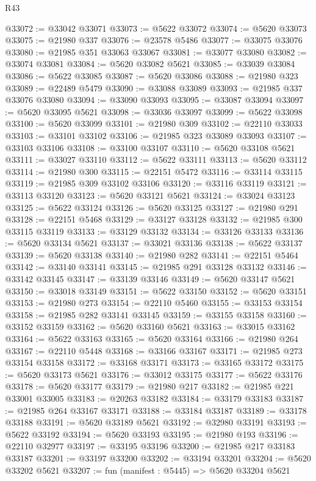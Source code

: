 \begin{lexlean}{R43}
\begin{coremodule}
@33072 := @33042 @33071
@33073 := @5622 @33072
@33074 := @5620 @33073
@33075 := @21980 @337
@33076 := @23578 @5486
@33077 := @33075 @33076
@33080 := @21985 @351 @33063 @33067
@33081 := @33077 @33080
@33082 := @33074 @33081
@33084 := @5620 @33082 @5621
@33085 := @33039 @33084
@33086 := @5622 @33085
@33087 := @5620 @33086
@33088 := @21980 @323
@33089 := @22489 @5479
@33090 := @33088 @33089
@33093 := @21985 @337 @33076 @33080
@33094 := @33090 @33093
@33095 := @33087 @33094
@33097 := @5620 @33095 @5621
@33098 := @33036 @33097
@33099 := @5622 @33098
@33100 := @5620 @33099
@33101 := @21980 @309
@33102 := @22110 @33033
@33103 := @33101 @33102
@33106 := @21985 @323 @33089 @33093
@33107 := @33103 @33106
@33108 := @33100 @33107
@33110 := @5620 @33108 @5621
@33111 := @33027 @33110
@33112 := @5622 @33111
@33113 := @5620 @33112
@33114 := @21980 @300
@33115 := @22151 @5472
@33116 := @33114 @33115
@33119 := @21985 @309 @33102 @33106
@33120 := @33116 @33119
@33121 := @33113 @33120
@33123 := @5620 @33121 @5621
@33124 := @33024 @33123
@33125 := @5622 @33124
@33126 := @5620 @33125
@33127 := @21980 @291
@33128 := @22151 @5468
@33129 := @33127 @33128
@33132 := @21985 @300 @33115 @33119
@33133 := @33129 @33132
@33134 := @33126 @33133
@33136 := @5620 @33134 @5621
@33137 := @33021 @33136
@33138 := @5622 @33137
@33139 := @5620 @33138
@33140 := @21980 @282
@33141 := @22151 @5464
@33142 := @33140 @33141
@33145 := @21985 @291 @33128 @33132
@33146 := @33142 @33145
@33147 := @33139 @33146
@33149 := @5620 @33147 @5621
@33150 := @33018 @33149
@33151 := @5622 @33150
@33152 := @5620 @33151
@33153 := @21980 @273
@33154 := @22110 @5460
@33155 := @33153 @33154
@33158 := @21985 @282 @33141 @33145
@33159 := @33155 @33158
@33160 := @33152 @33159
@33162 := @5620 @33160 @5621
@33163 := @33015 @33162
@33164 := @5622 @33163
@33165 := @5620 @33164
@33166 := @21980 @264
@33167 := @22110 @5448
@33168 := @33166 @33167
@33171 := @21985 @273 @33154 @33158
@33172 := @33168 @33171
@33173 := @33165 @33172
@33175 := @5620 @33173 @5621
@33176 := @33012 @33175
@33177 := @5622 @33176
@33178 := @5620 @33177
@33179 := @21980 @217
@33182 := @21985 @221 @33001 @33005
@33183 := @20263 @33182
@33184 := @33179 @33183
@33187 := @21985 @264 @33167 @33171
@33188 := @33184 @33187
@33189 := @33178 @33188
@33191 := @5620 @33189 @5621
@33192 := @32980 @33191
@33193 := @5622 @33192
@33194 := @5620 @33193
@33195 := @21980 @193
@33196 := @22110 @32977
@33197 := @33195 @33196
@33200 := @21985 @217 @33183 @33187
@33201 := @33197 @33200
@33202 := @33194 @33201
@33204 := @5620 @33202 @5621
@33207 := fun (manifest : @5445) => @5620 @33204 @5621

\end{coremodule}
\end{lexlean}

